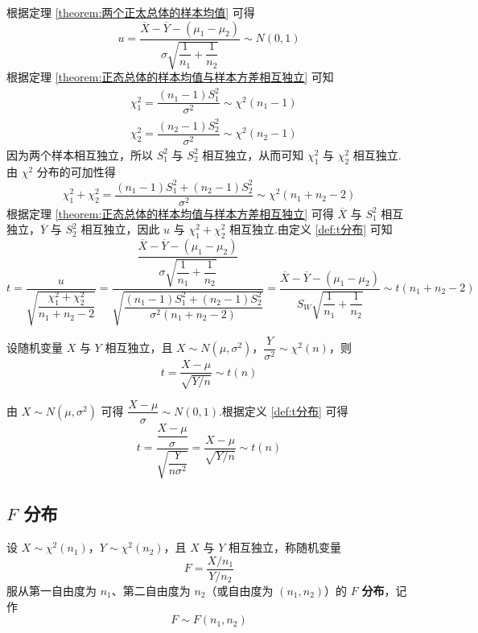 \begin{myproof}
    根据定理 \ref{theorem:两个正太总体的样本均值} 可得
    $$
    u = \dfrac{\overline{X} - \overline{Y} - (\mu_1 - \mu_2)}{\sigma \sqrt{\dfrac{1}{n_1} + \dfrac{1}{n_2}}} \sim N(0,1)
    $$
    根据定理 \ref{theorem:正态总体的样本均值与样本方差相互独立} 可知
    $$
    \begin{aligned}
        & \chi_1^2 = \dfrac{(n_1 - 1) S_1^2}{\sigma^2} \sim \chi^2(n_1 - 1) \\
        & \chi_2^2 = \dfrac{(n_2 - 1) S_2^2}{\sigma^2} \sim \chi^2(n_2 - 1)
    \end{aligned}
    $$
    因为两个样本相互独立，所以 $S_1^2$ 与 $S_2^2$ 相互独立，从而可知 $\chi_1^2$ 与 $\chi_2^2$ 相互独立.由 $\chi^2$ 分布的可加性得
    $$
    \chi_1^2 + \chi_2^2 = \dfrac{(n_1 - 1) S_1^2 + (n_2 - 1) S_2^2}{\sigma^2} \sim \chi^2(n_1 + n_2 - 2)
    $$
    根据定理 \ref{theorem:正态总体的样本均值与样本方差相互独立} 可得 $\overline{X}$ 与 $S_1^2$ 相互独立，$\overline{Y}$ 与 $S_2^2$ 相互独立，因此 $u$ 与 $\chi_1^2 + \chi_2^2$ 相互独立.由定义 \ref{def:t分布} 可知
    $$
    t = \dfrac{u}{\sqrt{\dfrac{\chi_1^2 + \chi_2^2}{n_1 + n_2 - 2}}} = \dfrac{\dfrac{\overline{X} - \overline{Y} - (\mu_1 - \mu_2)}{\sigma \sqrt{\dfrac{1}{n_1} + \dfrac{1}{n_2}}}}{\sqrt{\dfrac{(n_1 - 1) S_1^2 + (n_2 - 1) S_2^2}{\sigma^2 (n_1 + n_2 - 2)}}} = \dfrac{\overline{X} - \overline{Y} - (\mu_1 - \mu_2)}{S_W \sqrt{\dfrac{1}{n_1} + \dfrac{1}{n_2}}} \sim t(n_1 + n_2 - 2)
    $$
\end{myproof}

\begin{conclusion}
    设随机变量 $X$ 与 $Y$ 相互独立，且 $X \sim N(\mu, \sigma^2)$，$\dfrac{Y}{\sigma^2} \sim \chi^2(n)$，则
    $$
    t = \dfrac{X - \mu}{\sqrt{Y / n}} \sim t(n)
    $$
\end{conclusion}

\begin{myproof}
    由 $X \sim N(\mu, \sigma^2)$ 可得 $\dfrac{X - \mu}{\sigma} \sim N(0,1)$.根据定义 \ref{def:t分布} 可得
    $$
    t = \dfrac{\dfrac{X - \mu}{\sigma}}{\sqrt{\dfrac{Y}{n \sigma^2}}} = \dfrac{X - \mu}{\sqrt{Y / n}} \sim t(n)
    $$
\end{myproof}

\subsection{\texorpdfstring{$F$}{} 分布}

\begin{definition} \label{def:F分布}
    设 $X \sim \chi^2(n_1)$，$Y \sim \chi^2(n_2)$，且 $X$ 与 $Y$ 相互独立，称随机变量
    $$
    F = \dfrac{X / n_1}{Y / n_2}
    $$
    服从第一自由度为 $n_1$、第二自由度为 $n_2$（或自由度为 $(n_1,n_2)$）的 $F$ \textbf{分布}，记作
    $$
    F \sim F(n_1, n_2)
    $$
\end{definition}

